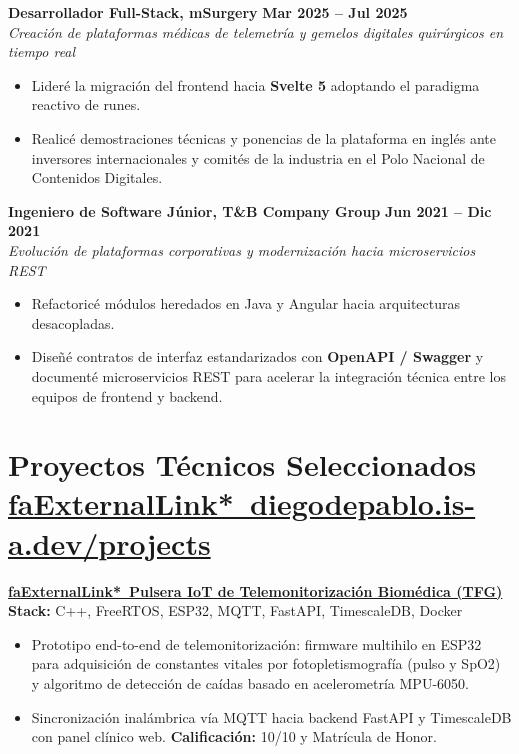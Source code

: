 \documentclass[a4paper,10pt]{article}
\begin{document}
\vspace{5pt}

\noindent\textbf{Desarrollador Full-Stack, mSurgery} \hfill {\footnotesize\color{subtext}\textbf{Mar 2025 -- Jul 2025}} \\
{\footnotesize\color{subtext}\textit{Creación de plataformas médicas de telemetría y gemelos digitales quirúrgicos en tiempo real}}
\begin{itemize}
  \item Lideré la migración del frontend hacia \textbf{Svelte 5} adoptando el paradigma reactivo de runes.
  \item Realicé demostraciones técnicas y ponencias de la plataforma en inglés ante inversores internacionales y comités de la industria en el Polo Nacional de Contenidos Digitales.
\end{itemize}

\vspace{5pt}

\noindent\textbf{Ingeniero de Software Júnior, T\&B Company Group} \hfill {\footnotesize\color{subtext}\textbf{Jun 2021 -- Dic 2021}} \\
{\footnotesize\color{subtext}\textit{Evolución de plataformas corporativas y modernización hacia microservicios REST}}
\begin{itemize}
  \item Refactoricé módulos heredados en Java y Angular hacia arquitecturas desacopladas.
  \item Diseñé contratos de interfaz estandarizados con \textbf{OpenAPI / Swagger} y documenté microservicios REST para acelerar la integración técnica entre los equipos de frontend y backend.
\end{itemize}

\section*{Proyectos Técnicos Seleccionados \hfill {\normalfont\scriptsize\color{subtext}\href{https://diegodepablo.is-a.dev/projects}{\csname faExternalLink*\endcsname\ diegodepablo.is-a.dev/projects}}}

\noindent\textbf{\href{https://diegodepablo.is-a.dev/projects/tfg-patient-monitoring}{\csname faExternalLink*\endcsname\ Pulsera IoT de Telemonitorización Biomédica (TFG)}} \hfill {\scriptsize\color{subtext}\textbf{Stack:} C++, FreeRTOS, ESP32, MQTT, FastAPI, TimescaleDB, Docker}
\begin{itemize}
  \item Prototipo end-to-end de telemonitorización: firmware multihilo en ESP32 para adquisición de constantes vitales por fotopletismografía (pulso y SpO2) y algoritmo de detección de caídas basado en acelerometría MPU-6050.
  \item Sincronización inalámbrica vía MQTT hacia backend FastAPI y TimescaleDB con panel clínico web. \textbf{Calificación:} 10/10 y Matrícula de Honor.
\end{itemize}
\end{document}
